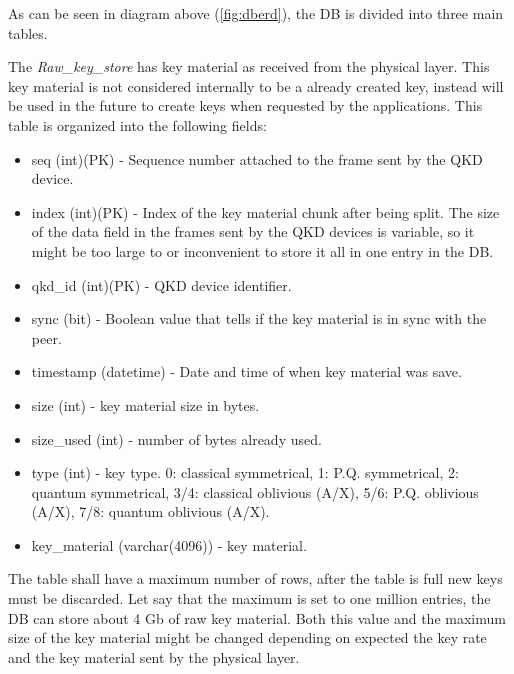 \begin{refsection}
As can be seen in diagram above (\autoref{fig:dberd}), the \ac{DB} is divided into three main tables. 

The \textit{Raw\_key\_store} has key material as received from the physical layer. This key material is not considered internally to be a already created key, instead will be used in the future to create keys when requested by the applications. This table is organized into the following fields:
\begin{itemize}
	\item seq (int)(PK) - Sequence number attached to the frame sent by the QKD device.
	\item index (int)(PK) - Index of the key material chunk after being split. The size of the data field in the frames sent by the QKD devices is variable, so it might be too large to or inconvenient to store it all in one entry in the \ac{DB}.
	\item qkd\_id (int)(PK) - QKD device identifier. 
	\item sync (bit) - Boolean value that tells if the key material is in sync with the peer.
	\item timestamp (datetime) - Date and time of when key material was save.
	\item size (int) - key material size in bytes.
	\item size\_used (int) - number of bytes already used.
	\item type (int) - key type. 0: classical symmetrical, 1: P.Q. symmetrical, 2: quantum symmetrical, 3/4: classical oblivious (A/X), 5/6: P.Q. oblivious (A/X), 7/8: quantum oblivious (A/X). 
	\item key\_material (varchar(4096)) - key material.
\end{itemize}

The table shall have a maximum number of rows, after the table is full new keys must be discarded. Let say that the maximum is set to one million entries, the \ac{DB} can store about 4 Gb of raw key material. Both this value and the maximum size of the key material might be changed depending on expected the key rate and the key material sent by the physical layer.

\vspace{5mm}


\end{refsection}
